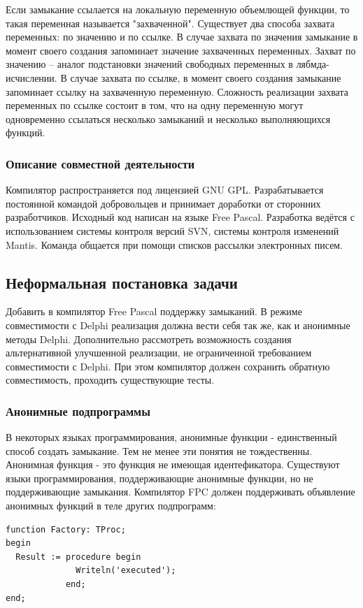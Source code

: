 \documentclass{imcs}
\begin{document}
Если замыкание ссылается на локальную переменную объемлющей функции, то такая переменная 
называется "захваченной"\cite{anonymmethods}\cite{cpp}. Существует два
способа захвата переменных: по значению и по ссылке. В случае захвата по значения
замыкание в момент своего создания запоминает значение захваченных переменных.
Захват по значению -- аналог подстановки значений свободных переменных в лябмда-исчислении.
В случае захвата по ссылке, в момент своего создания замыкание запоминает ссылку 
на захваченную переменную. Сложность реализации захвата переменных по ссылке состоит в том,
что на одну переменную могут одновременно ссылаться несколько замыканий и несколько
выполняющихся функций.

\subsubsection{Описание совместной деятельности}

Компилятор распространяется под лицензией GNU GPL\cite{gpl}. Разрабатывается
постоянной командой добровольцев и принимает доработки от сторонних разработчиков.
Исходный код написан на языке Free Pascal. Разработка ведётся с использованием системы
контроля версий SVN\cite{subversion}, системы контроля изменений Mantis\cite{mantis2}.
Команда общается при помощи списков рассылки электронных писем.

\subsection{Неформальная постановка задачи}

Добавить в компилятор Free Pascal поддержку замыканий. В режиме совместимости с 
Delphi реализация должна вести себя так же, как и анонимные методы
Delphi. Дополнительно рассмотреть возможность создания альтернативной улучшенной
реализации, не ограниченной требованием совместимости с Delphi.
При этом компилятор должен сохранить обратную совместимость, проходить существующие тесты. 

\subsubsection{Анонимные подпрограммы}

В некоторых языках программирования, анонимные функции - единственный
способ создать замыкание. Тем не менее эти понятия не тождественны.
Анонимная функция - это функция не имеющая идентефикатора. Существуют
языки программирования, поддерживающие анонимные функции, но не
поддерживающие замыкания. Компилятор FPC должен поддерживать
объявление анонимных функций в теле других подпрограмм:
\begin{lstlisting}
function Factory: TProc;
begin
  Result := procedure begin
              Writeln('executed');
            end;
end;
\end{lstlisting}
\end{document}
